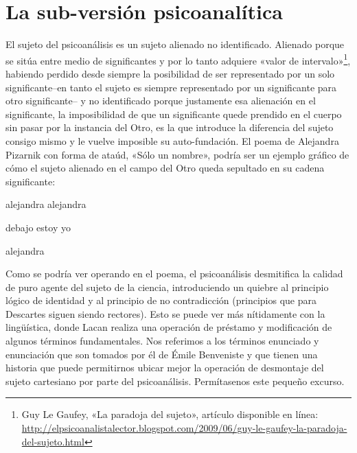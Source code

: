 \section{La sub-versión psicoanalítica}

El sujeto del psicoanálisis es un sujeto alienado no identificado. Alienado porque se sitúa entre medio de significantes y por lo tanto adquiere «valor de intervalo»\footnote{Guy Le Gaufey, «La paradoja del sujeto», artículo disponible en línea: \url{http://elpsicoanalistalector.blogspot.com/2009/06/guy-le-gaufey-la-paradoja-del-sujeto.html}}, habiendo perdido desde siempre la posibilidad de ser representado por un solo significante--en tanto el sujeto es siempre representado por un significante para otro significante-- y no identificado porque justamente esa alienación en el significante, la imposibilidad de que un significante quede prendido en el cuerpo sin pasar por la instancia del Otro, es la que introduce la diferencia del sujeto consigo mismo y le vuelve imposible su auto-fundación. El poema de Alejandra Pizarnik con forma de ataúd, «Sólo un nombre», podría ser un ejemplo gráfico de cómo el sujeto alienado en el campo del Otro queda sepultado en su cadena significante:

alejandra alejandra

debajo estoy yo

alejandra

Como se podría ver operando en el poema, el psicoanálisis desmitifica la calidad de puro agente del sujeto de la ciencia, introduciendo un quiebre al principio lógico de identidad y al principio de no contradicción (principios que para Descartes siguen siendo rectores). Esto se puede ver más nítidamente con la lingüística, donde Lacan realiza una operación de préstamo y modificación de algunos términos fundamentales. Nos referimos a los términos enunciado y enunciación que son tomados por él de Émile Benveniste y que tienen una historia que puede permitirnos ubicar mejor la operación de desmontaje del sujeto cartesiano por parte del psicoanálisis. Permítasenos este pequeño excurso.

